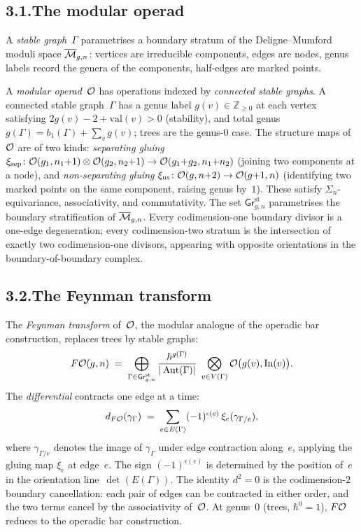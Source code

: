 \subsection*{3.1.\enspace The modular operad}

A \emph{stable graph}~$\Gamma$ parametrises a boundary stratum of
the Deligne--Mumford moduli space $\overline{\mathcal{M}}_{g,n}$: vertices
are irreducible components, edges are nodes, genus labels record the
genera of the components, half-edges are marked points.

A \emph{modular operad}~$\mathcal{O}$ has operations indexed
by \emph{connected stable graphs}. A connected
stable graph~$\Gamma$ has a genus label
$g(v)\in\mathbb Z_{\ge 0}$ at each vertex satisfying
$2g(v)-2+\mathrm{val}(v)>0$ (stability), and total genus
$g(\Gamma)=b_1(\Gamma)+\sum_v g(v)$; trees are the
genus-$0$ case.
The structure maps of~$\mathcal{O}$ are of two kinds:
\emph{separating gluing}
$\xi_{\mathrm{sep}} \colon
\mathcal{O}(g_1, n_1{+}1) \otimes \mathcal{O}(g_2, n_2{+}1)
\to \mathcal{O}(g_1{+}g_2, n_1{+}n_2)$
(joining two components at a node), and
\emph{non-separating gluing}
$\xi_{\mathrm{ns}} \colon \mathcal{O}(g, n{+}2)
\to \mathcal{O}(g{+}1, n)$
(identifying two marked points on the same component,
raising genus by~$1$). These satisfy $\Sigma_n$-equivariance,
associativity, and commutativity.
The set
$\mathsf{Gr}^{\mathrm{st}}_{g,n}$ parametrises the boundary
stratification of $\overline{\mathcal{M}}_{g,n}$. Every codimension-one
boundary divisor is a one-edge degeneration; every codimension-two
stratum is the intersection of exactly two codimension-one divisors,
appearing with opposite orientations in the boundary-of-boundary
complex.

\subsection*{3.2.\enspace The Feynman transform}

The \emph{Feynman transform} of~$\mathcal{O}$, the modular analogue of
the operadic bar construction, replaces trees by stable graphs:
\begin{equation}\label{eq:preface-feynman-sum}
F\mathcal{O}(g,n)
\;=\;
\bigoplus_{\Gamma\in\mathsf{Gr}^{\mathrm{st}}_{g,n}}
\frac{\hbar^{g(\Gamma)}}{|\operatorname{Aut}(\Gamma)|}
\;\bigotimes_{v\in V(\Gamma)}\mathcal{O}\bigl(g(v),\mathrm{In}(v)\bigr).
\end{equation}
The \emph{differential} contracts one edge at a time:
\[
d_{F\mathcal{O}}(\gamma_\Gamma)
\;=\;
\sum_{e \in E(\Gamma)}
(-1)^{\epsilon(e)}\,
\xi_e(\gamma_{\Gamma/e}),
\]
where $\gamma_{\Gamma/e}$ denotes the image of $\gamma_\Gamma$
under edge contraction along~$e$, applying the gluing map
$\xi_e$ at edge~$e$. The sign $(-1)^{\epsilon(e)}$ is determined by
the position of~$e$ in the orientation
line~$\det(E(\Gamma))$. The identity $d^2 = 0$ is the
codimension-$2$ boundary cancellation: each pair of edges can be
contracted in either order, and the two terms cancel by the
associativity of~$\mathcal{O}$. At genus~$0$ (trees, $\hbar^0=1$),
$F\mathcal{O}$ reduces to the operadic bar construction.


